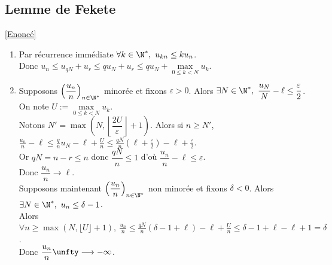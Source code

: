 \documentclass{book}
\begin{document}
	\subsection{Lemme de Fekete }
	\label{sec:lemme-de-fekete}
	\textcolor{blue}{\hyperref[Lemme de Fekete]{[Enoncé]}}\\
	\begin{enumerate}[leftmargin=*]
		\item Par récurrence immédiate $\forall k\in \N^*,\ u_{kn}\leq ku_n$.\\
		Donc $u_n\leq u_{qN}+u_r\leq qu_N+u_r\leq qu_N+\max\limits_{0\leq k<N}u_k$.
		\item Supposons $\left(\dfrac{u_n}{n}\right)_{n\in \N^*}$ minorée et fixons $\varepsilon>0$. Alors $\exists N\in \N^*,\ \dfrac{u_N}{N}-\ell\leq\dfrac{\varepsilon}{2}$. On note $U:=\max\limits_{0\leq k<N}u_k$.\\
		Notons $N'=\max\left(N,\left\lfloor\dfrac{2U}{\varepsilon}\right\rfloor+1\right)$. Alors si $n\geq N'$, $\displaystyle\frac{u_n}{n}-\ell\leq \frac{q}{n}u_N-\ell+\frac{U}{n}\leq \frac{qN}{n}\left(\ell+\frac{\varepsilon}{2}\right)-\ell+\frac{\varepsilon}{2}$.\\
		Or $qN=n-r\leq n$ donc $\dfrac{qN}{n}\leq 1$ d'où $\dfrac{u_n}{n}-\ell\leq \varepsilon$.\\
		Donc $\dfrac{u_n}{n}\longrightarrow\ell$.\\
		Supposons maintenant $\left(\dfrac{u_n}{n}\right)_{n\in \N^*}$ non minorée et fixons $\delta<0$. Alors $\exists N\in \N^*,\ u_n\leq \delta-1$.\\
		Alors $\forall n\geq \max(N,\lfloor U\rfloor+1),\ \displaystyle\frac{u_n}{n}\leq \frac{qN}{n}\left(\delta-1+\ell\right)-\ell+\frac{U}{n}\leq \delta-1+\ell-\ell+1=\delta$.\\
		Donc $\dfrac{u_n}{n}\unfty\longrightarrow-\infty$.
	\end{enumerate}
	
\end{document}
